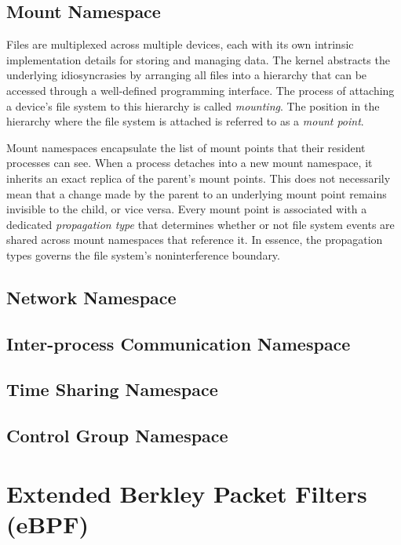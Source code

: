 

\subsection{Mount Namespace}
\label{sections:fundamentals/namespaces/mount}
Files are multiplexed across multiple devices, each with its own intrinsic implementation details 
for storing and managing data. The kernel abstracts the underlying idiosyncrasies 
by arranging all files into a hierarchy that can be accessed through a well-defined programming interface. 
The process of attaching a device's file system 
to this hierarchy is called \textit{mounting}. The position in the hierarchy where the file system 
is attached is referred to as a \textit{mount point}.

Mount namespaces encapsulate the list of mount points that their resident processes can 
see. When a process detaches into a new mount namespace, it inherits an exact replica of the parent's mount points.
This does not necessarily mean that a change made by the parent to an underlying mount point remains 
invisible to the child, or vice versa. Every mount point is associated with a dedicated \textit{propagation type} 
that determines whether or not file system events are shared across mount namespaces 
that reference it. In essence, the propagation types governs the file system's noninterference boundary.

\subsection{Network Namespace}
\label{sections:fundamentals/namespaces/network}

\subsection{Inter-process Communication Namespace}
\label{sections:fundamentals/namespaces/ipc}

\subsection{Time Sharing Namespace}
\label{sections:fundamentals/namespaces/uts}

\subsection{Control Group Namespace}
\label{sections:fundamentals/namespaces/cgroups}

\section{Extended Berkley Packet Filters (eBPF)}
\label{sections:fundamentals/ebpf}